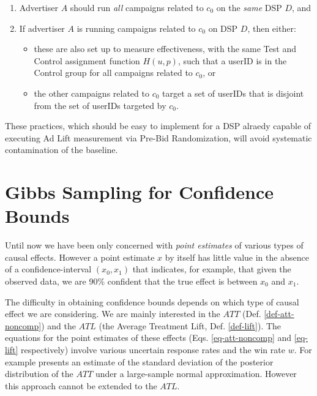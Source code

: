 \documentclass[11pt,a4paper]{article}
\theoremstyle{definition}
\theoremstyle{remark}
\theoremstyle{definition}
\theoremstyle{definition}
\theoremstyle{definition}
\theoremstyle{definition}
\theoremstyle{definition}
\theoremstyle{definition}
\newtheorem{assumption}{Assumption
}[section]
\begin{document}
\begin{enumerate}
		\item Advertiser $A$ should run \textit{all} campaigns related to $c_0$  on the \textit{same} DSP $D$, and 
		\item If advertiser $A$ is running campaigns related to $c_0$ on DSP $D$, then either:
	\begin{itemize}
		\item these are also set up to measure effectiveness, with the same Test and Control assignment function $H(u,p)$, such that a userID is in the Control group for all campaigns related to $c_0$, or
		\item the other campaigns related to $c_0$ target a set of userIDs that is disjoint from the set of userIDs targeted by $c_0$. %
	\end{itemize}
\end{enumerate}

These practices, which should be easy to implement for a DSP alraedy capable of executing Ad Lift measurement via Pre-Bid Randomization, will avoid systematic contamination of the baseline.  

\section{Gibbs Sampling for Confidence Bounds} \label{sec-gibbs}

Until now we have been only concerned with \textit{point estimates} of various types of causal effects. However a point estimate $x$ by itself has little value in the absence of a confidence-interval $(x_0,x_1)$ that indicates, for example, that given the observed data, we are 90\% confident that the true effect is between $x_0$ and $x_1$.

The difficulty in obtaining confidence bounds depends on which type of causal effect we are considering. 
We are mainly interested in the $ATT$ (Def. \ref{def-att-noncomp}) and the 
$ATL$ (the Average Treatment Lift, Def. \ref{def-lift}). 
The equations for the point estimates of these effects (Eqs. \ref{eq-att-noncomp} and \ref{eq-lift} respectively) involve various uncertain response rates and the win rate $w$. 
For example \cite{Imbens1997a} presents an estimate of the standard deviation of the posterior distribution of the $ATT$ under a large-sample normal approximation. 
However this approach cannot be extended to the $ATL$.
\end{document}
